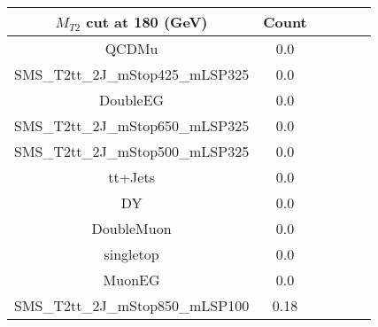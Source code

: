 \documentclass[8pt]{article}
\begin{document}
\begin{tabular}{|c|c|c|c|c|c|}
\hline
$M_{T2}$ cut at 180 (GeV) & Count \\
\hline
\hline
QCDMu & 0.0\\
SMS\_T2tt\_2J\_mStop425\_mLSP325 & 0.0\\
DoubleEG & 0.0\\
SMS\_T2tt\_2J\_mStop650\_mLSP325 & 0.0\\
SMS\_T2tt\_2J\_mStop500\_mLSP325 & 0.0\\
tt+Jets & 0.0\\
DY & 0.0\\
DoubleMuon & 0.0\\
singletop & 0.0\\
MuonEG & 0.0\\
SMS\_T2tt\_2J\_mStop850\_mLSP100 & 0.18\\
\hline
\hline
\end{tabular}
\end{document}
